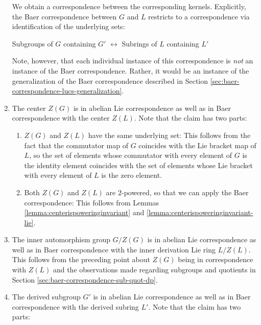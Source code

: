 \begin{enumerate}
  We obtain a correspondence between the corresponding
  kernels. Explicitly, the Baer correspondence between $G$ and $L$
  restricts to a correspondence via identification of the underlying
  sets:

  \begin{center}
    Subgroups of $G$ containing $G'$ $\leftrightarrow$ Subrings of $L$ containing $L'$
  \end{center}

  Note, however, that each individual instance of this correspondence
  is {\em not} an instance of the Baer correspondence. Rather, it
  would be an instance of the generalization of the Baer
  correspondence described in Section
  \ref{sec:baer-correspondence-lucs-generalization}.
\item The center $Z(G)$ is in abelian Lie correspondence as well as in
  Baer correspondence with the center $Z(L)$. Note that the claim has
  two parts:

  \begin{enumerate}
  \item $Z(G)$ and $Z(L)$ have the same underlying set: This follows
    from the fact that the commutator map of $G$ coincides with the
    Lie bracket map of $L$, so the set of elements whose commutator
    with every element of $G$ is the identity element coincides with
    the set of elements whose Lie bracket with every element of $L$ is
    the zero element.
  \item Both $Z(G)$ and $Z(L)$ are $2$-powered, so that we can apply
    the Baer correspondence: This follows from Lemmas
    \ref{lemma:centerispoweringinvariant} and
    \ref{lemma:centerispoweringinvariant-lie}.
  \end{enumerate}

\item The inner automorphism group $G/Z(G)$ is in abelian Lie
  correspondence as well as in Baer correspondence with the inner
  derivation Lie ring $L/Z(L)$. This follows from the preceding point
  about $Z(G)$ being in correspondence with $Z(L)$ and the
  observations made regarding subgroups and quotients in Section
  \ref{sec:baer-correspondence-sub-quot-dp}.
\item The derived subgroup $G'$ is in abelian Lie correspondence as
  well as in Baer correspondence with the derived subring $L'$. Note
  that the claim has two parts:


\end{enumerate}
